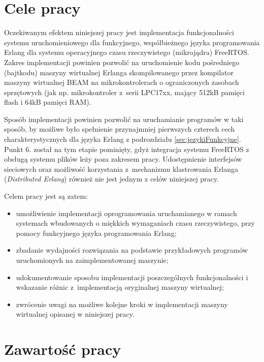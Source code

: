 \section{Cele pracy}
\label{sec:celePracy}

Oczekiwanym efektem niniejszej pracy jest implementacja funkcjonalności systemu uruchomieniowego dla funkcyjnego, współbieżnego języka programowania Erlang dla systemu operacyjnego czasu rzeczywistego (mikrojądra) FreeRTOS.
Zakres implementacji powinien pozwolić na uruchomienie kodu pośredniego (bajtkodu) maszyny wirtualnej Erlanga skompilowanego przez kompilator maszyny wirtualnej BEAM na mikrokontrolerach o ograniczonych zasobach sprzętowych (jak np. mikrokontroler z~serii LPC17xx, mający 512kB pamięci flash i 64kB pamięci RAM).

Sposób implementacji powinien pozwolić na uruchamianie programów w taki sposób, by możliwe było spełnienie przynajmniej pierwszych czterech cech charakterystycznych dla języka Erlang z podrozdziału \ref{sec:jezykiFunkcyjne}. Punkt 6. został na tym etapie pominięty, gdyż integracja systemu FreeRTOS z obsługą systemu plików leży poza zakresem pracy. Udostępnienie interfejsów sieciowych oraz możliwość korzystania z~mechanizmu klastrowania Erlanga (\emph{Distributed Erlang}) również nie jest jednym z celów niniejszej pracy.

Celem pracy jest są zatem:
\begin{itemize}
\item umożliwienie implementacji oprogramowania uruchamianego w ramach systemach wbudowanych o miękkich wymaganiach czasu rzeczywistego, przy pomocy funkcyjnego języka programowania Erlang;
\item zbadanie wydajności rozwiązania na podstawie przykładowych programów uruchomionych na zaimplementowanej maszynie;
\item udokumentowanie sposobu implementacji poszczególnych funkcjonalności i wskazanie różnic z~implementacją oryginalnej maszyny wirtualnej;
\item zwrócenie uwagi na możliwe kolejne kroki w implementacji maszyny wirtualnej opisanej w niniejszej pracy.
\end{itemize}


\section{Zawartość pracy}
\label{sec:zawartoscPracy}

